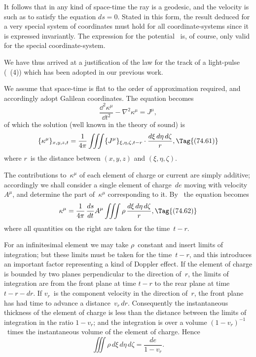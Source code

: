 \documentclass[12pt]{book}
\begin{document}
It follows that in any kind of space-time the ray is a geodesic, and the
velocity is such as to satisfy the equation $ds = 0$. Stated in this form, the
result deduced for a very special system of coordinates must hold for all
coordinate\hyp{}systems since it is expressed invariantly. The expression for the
potential~ is, of course, only valid for the special coordinate\hyp{}system.

We have thus arrived at a justification of the law for the track of a light-pulse
(~(4)) which has been adopted in our previous work.


We assume that space-time is flat to the order of approximation required,
and accordingly adopt Galilean coordinates. The equation becomes
\[
\frac{\dd^{2}\kappa^{\mu}}{\dd t^{2}} - \nabla^2\kappa^{\mu} = J^{\mu},
\]
of which the solution (well known in the theory of sound) is
\[
\{\kappa^{\mu}\}_{x,y,z,t} = \frac{1}{4\pi} \iiint \{J^{\mu}\}_{\xi,\eta,\zeta,t-r} \cdot \frac{d\xi\, d\eta\, d\zeta}{r},
\Tag{(74.61)}
\]
where $r$~is the distance between $(x, y, z)$ and $(\xi,\eta, \zeta)$.

The contributions to~$\kappa^{\mu}$ of each element of charge or current are simply
additive; accordingly we shall consider a single element of charge~$de$ moving
with velocity~$A^{\mu}$, and determine the part of~$\kappa^{\mu}$ corresponding to it. By~
the equation becomes
\[
\kappa^{\mu} = \frac{1}{4\pi}\, \frac{ds}{dt} A^{\mu} \iiint \rho\, \frac{d\xi\, d\eta\, d\zeta}{r},
\Tag{(74.62)}
\]
where all quantities on the right are taken for the time~$t - r$.

For an infinitesimal element we may take $\rho$~constant and insert limits of
integration; but these limits must be taken for the time~$t - r$, and this introduces
an important factor representing a kind of Doppler effect. If the element
of charge is bounded by two planes perpendicular to the direction of~$r$, the
limits of integration are from the front plane at time $t - r$ to the rear plane
%
at time $t - r - dr$. If $v_{r}$~is the component velocity in the direction of~$r$, the
front plane has had time to advance a distance~$v_{r}\, dr$. Consequently the
instantaneous thickness of the element of charge is less than the distance
between the limits of integration in the ratio $1 - v_{r}$; and the integration is
over a volume $(1 - v_{r})^{-1}$~times the instantaneous volume of the element of
charge. Hence
\[
\iiint \rho\, d\xi\, d\eta\, d\zeta = \frac{de}{1 - v_{r}}.
\]
\end{document}
